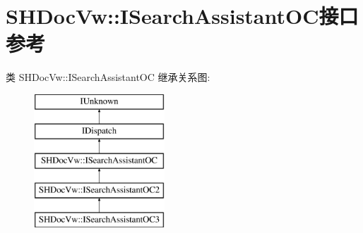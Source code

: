 \hypertarget{interface_s_h_doc_vw_1_1_i_search_assistant_o_c}{}\section{S\+H\+Doc\+Vw\+:\+:I\+Search\+Assistant\+O\+C接口 参考}
\label{interface_s_h_doc_vw_1_1_i_search_assistant_o_c}
类 S\+H\+Doc\+Vw\+:\+:I\+Search\+Assistant\+OC 继承关系图\+:\begin{figure}[H]
\begin{center}
\leavevmode
\includegraphics[height=5.000000cm]{interface_s_h_doc_vw_1_1_i_search_assistant_o_c}
\end{center}
\end{figure}

